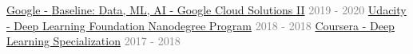 \begin{cventries}
 \vspace{-10mm} \cventry 
    {}
    {}
    {}
    {}
    {}
  \vspace{-8mm} \cventry
    {}
    {\hspace*{0.5mm}\bullet \hspace*{0.5mm}\href{https://google.qwiklabs.com/public_profiles/899da30d-b2d2-415e-87a3-ae18143a937c}{ Google - \textmd{Baseline: Data, ML, AI - Google Cloud Solutions II}}}
    {\textcolor{graytext}{2019 - 2020}}
    {}
    {}\vspace{-8mm} 
\cventry
    {}
    {\hspace*{0.5mm}\bullet \hspace*{0.5mm} \href{https://confirm.udacity.com/SQP4EA2H}{Udacity - \textmd{ Deep Learning Foundation Nanodegree Program}}}
    {\textcolor{graytext}{2018 - 2018}}
    {}
    {  
    }\vspace{-8mm}
\cventry
    {}
    {\hspace*{0.5mm}\bullet \hspace*{0.5mm}\href{https://www.coursera.org/account/accomplishments/certificate/H6GGFHWH4K6L}{ Coursera - \textmd{ Deep Learning Specialization}}}
    {\textcolor{graytext}{2017 - 2018}}
    {}
    {}
\end{cventries}
